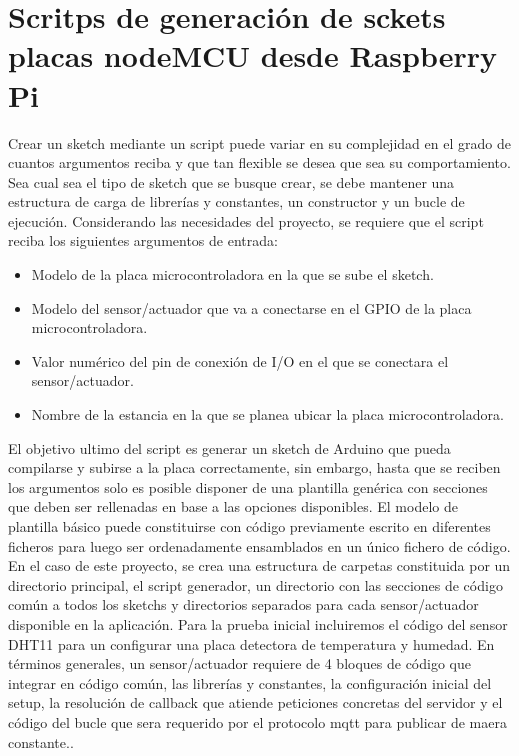 \section{Scritps de generación de sckets placas nodeMCU desde Raspberry Pi}
\label{AppendiA:Key5}

Crear un sketch mediante un script puede variar en su complejidad en el grado de cuantos argumentos reciba y que tan flexible se desea que sea su comportamiento. Sea cual sea el tipo de sketch que se busque crear, se debe mantener una estructura de carga de librerías y constantes, un constructor y un bucle de ejecución. Considerando las necesidades del proyecto, se requiere que el script reciba los siguientes argumentos de entrada:

\begin{itemize}
  \item Modelo de la placa microcontroladora en la que se sube el sketch.

  \item Modelo del sensor/actuador que va a conectarse en el GPIO de la placa microcontroladora.

  \item Valor numérico del pin de conexión de I/O en el que se conectara el sensor/actuador.
  
  \item Nombre de la estancia en la que se planea ubicar la placa microcontroladora.
\end{itemize}

El objetivo ultimo del \gls{script} es generar un \gls{sketch} de Arduino que pueda compilarse y subirse a la placa correctamente, sin embargo, hasta que se reciben los argumentos solo es posible disponer de una plantilla genérica con secciones que deben ser rellenadas en base a las opciones disponibles. El modelo de plantilla básico puede constituirse con código previamente escrito en diferentes ficheros para luego ser ordenadamente ensamblados en un único fichero de código. En el caso de este proyecto, se crea una estructura de carpetas constituida por un directorio principal, el script generador, un directorio con las secciones de código común a todos los sketchs y directorios separados para cada sensor/actuador disponible en la aplicación. Para la prueba inicial incluiremos el código del sensor DHT11 para un configurar una placa detectora de temperatura y humedad. En términos generales, un sensor/actuador requiere de 4 bloques de código que integrar en código común, las librerías y constantes, la configuración inicial del setup, la resolución de callback que atiende peticiones concretas del servidor y el código del bucle que sera requerido por el protocolo \gls{mqtt} para publicar de maera constante..

